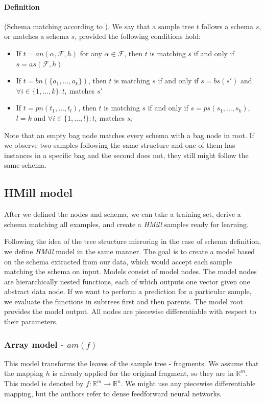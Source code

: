 \paragraph{Definition} (Schema matching according to \cite{Mandlik2020}). We say that a sample tree $t$ follows a schema $s$, or matches a schema $s$, provided the following conditions hold:
\begin{itemize}
    \itemsep0em 
    \item If $t=an(\alpha,\mathcal{F},h)$ for any $\alpha\in\mathcal{F}$, then $t$ is matching $s$ if and only if $s=as(\mathcal{F},h)$
    \item If $t=bn(\{a_1,\dots,a_k\})$, then $t$ is matching $s$ if and only if $s=bs(s')$ and $\forall i\in\{1,\dots,k\}:t_i$ matches $s'$
    \item If $t=pn(t_1,\dots,t_l)$, then $t$ is matching $s$ if and only if $s=ps(s_1,\dots,s_k)$,$l=k$ and $\forall i\in\{1,\dots,l\}:t_i$ matches $s_i$
\end{itemize}

Note that an empty bag node matches every schema with a bag node in root. If we observe two samples following the same structure and one of them has instances in a specific bag and the second does not, they still might follow the same schema.

\subsection{HMill model}
After we defined the nodes and schema, we can take a training set, derive a schema matching all examples, and create a \emph{HMill} samples ready for learning. 

Following the idea of the tree structure mirroring in the case of schema definition, we define \emph{HMill} model in the same manner. The goal is to create a model based on the schema extracted from our data, which would accept each sample matching the schema on input. Models consist of model nodes. The model nodes are hierarchically nested functions, each of which outputs one vector given one abstract data node. If we want to perform a prediction for a particular sample, we evaluate the functions in subtrees first and then parents. The model root provides the model output. All nodes are piecewise differentiable with respect to their parameters.

\subsubsection{Array model - $am(f)$}
This model transforms the leaves of the sample tree - fragments. We assume that the mapping $h$ is already applied for the original fragment, so they are in $\mathbb{R}^m$.  This model is denoted by $f:\mathbb{R}^m\rightarrow\mathbb{R}^n$. We might use any piecewise differentiable mapping, but the authors refer to dense feedforward neural networks.

